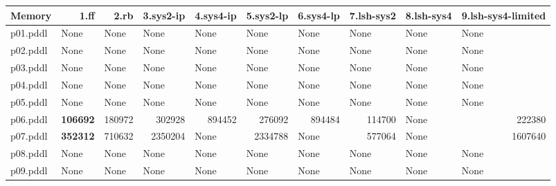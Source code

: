 \documentclass{article}
\begin{document}
\begin{tabular}{@{}lrrrrrrrrr@{}}
Memory & 1.ff & 2.rb & 3.sys2-ip & 4.sys4-ip & 5.sys2-lp & 6.sys4-lp & 7.lsh-sys2 & 8.lsh-sys4 & 9.lsh-sys4-limited \\
\midrule
p01.pddl & \multicolumn{1}{|l|}{None} & \multicolumn{1}{|l|}{None} & \multicolumn{1}{|l|}{None} & \multicolumn{1}{|l|}{None} & \multicolumn{1}{|l|}{None} & \multicolumn{1}{|l|}{None} & \multicolumn{1}{|l|}{None} & \multicolumn{1}{|l|}{None} & \multicolumn{1}{|l|}{None} \\
p02.pddl & \multicolumn{1}{|l|}{None} & \multicolumn{1}{|l|}{None} & \multicolumn{1}{|l|}{None} & \multicolumn{1}{|l|}{None} & \multicolumn{1}{|l|}{None} & \multicolumn{1}{|l|}{None} & \multicolumn{1}{|l|}{None} & \multicolumn{1}{|l|}{None} & \multicolumn{1}{|l|}{None} \\
p03.pddl & \multicolumn{1}{|l|}{None} & \multicolumn{1}{|l|}{None} & \multicolumn{1}{|l|}{None} & \multicolumn{1}{|l|}{None} & \multicolumn{1}{|l|}{None} & \multicolumn{1}{|l|}{None} & \multicolumn{1}{|l|}{None} & \multicolumn{1}{|l|}{None} & \multicolumn{1}{|l|}{None} \\
p04.pddl & \multicolumn{1}{|l|}{None} & \multicolumn{1}{|l|}{None} & \multicolumn{1}{|l|}{None} & \multicolumn{1}{|l|}{None} & \multicolumn{1}{|l|}{None} & \multicolumn{1}{|l|}{None} & \multicolumn{1}{|l|}{None} & \multicolumn{1}{|l|}{None} & \multicolumn{1}{|l|}{None} \\
p05.pddl & \multicolumn{1}{|l|}{None} & \multicolumn{1}{|l|}{None} & \multicolumn{1}{|l|}{None} & \multicolumn{1}{|l|}{None} & \multicolumn{1}{|l|}{None} & \multicolumn{1}{|l|}{None} & \multicolumn{1}{|l|}{None} & \multicolumn{1}{|l|}{None} & \multicolumn{1}{|l|}{None} \\
p06.pddl & \textbf{106692} & 180972 & 302928 & 894452 & 276092 & 894484 & 114700 & \multicolumn{1}{|l|}{None} & 222380 \\
p07.pddl & \textbf{352312} & 710632 & 2350204 & \multicolumn{1}{|l|}{None} & 2334788 & \multicolumn{1}{|l|}{None} & 577064 & \multicolumn{1}{|l|}{None} & 1607640 \\
p08.pddl & \multicolumn{1}{|l|}{None} & \multicolumn{1}{|l|}{None} & \multicolumn{1}{|l|}{None} & \multicolumn{1}{|l|}{None} & \multicolumn{1}{|l|}{None} & \multicolumn{1}{|l|}{None} & \multicolumn{1}{|l|}{None} & \multicolumn{1}{|l|}{None} & \multicolumn{1}{|l|}{None} \\
p09.pddl & \multicolumn{1}{|l|}{None} & \multicolumn{1}{|l|}{None} & \multicolumn{1}{|l|}{None} & \multicolumn{1}{|l|}{None} & \multicolumn{1}{|l|}{None} & \multicolumn{1}{|l|}{None} & \multicolumn{1}{|l|}{None} & \multicolumn{1}{|l|}{None} & \multicolumn{1}{|l|}{None} \\

\end{tabular}
\end{document}

